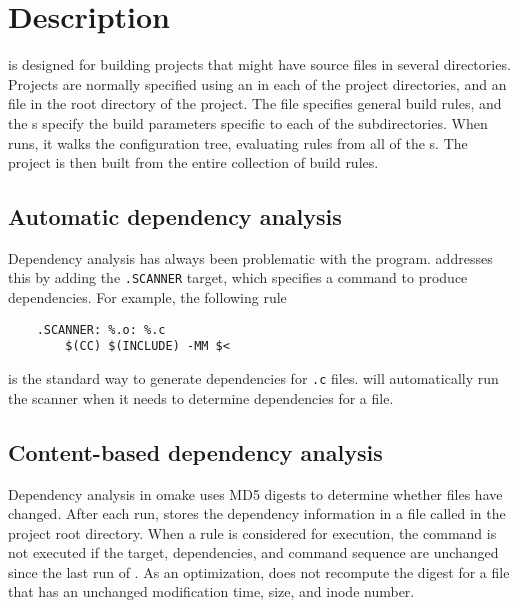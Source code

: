 %
\chapter{Description}
\label{chapter:omake}

 is designed for building projects that might have source files in several directories.
Projects are normally specified using an  in each of the project directories, and an
 file in the root directory of the project.  The  file specifies
general build rules, and the s specify the build parameters specific to each of the
subdirectories.  When  runs, it walks the configuration tree, evaluating rules from all
of the s.  The project is then built from the entire collection of build rules.

\section{Automatic dependency analysis}

Dependency analysis has always been problematic with the  program.  
addresses this by adding the \verb+.SCANNER+ target, which specifies a command to produce
dependencies.  For example, the following rule

\begin{verbatim}
    .SCANNER: %.o: %.c
        $(CC) $(INCLUDE) -MM $<
\end{verbatim}

is the standard way to generate dependencies for \verb+.c+ files.   will automatically
run the scanner when it needs to determine dependencies for a file.

\section{Content-based dependency analysis}

Dependency analysis in omake uses MD5 digests to determine whether files have changed.  After each
run,  stores the dependency information in a file called  in the project
root directory.  When a rule is considered for execution, the command is not executed if the target,
dependencies, and command sequence are unchanged since the last run of .  As an
optimization,  does not recompute the digest for a file that has an unchanged
modification time, size, and inode number.

